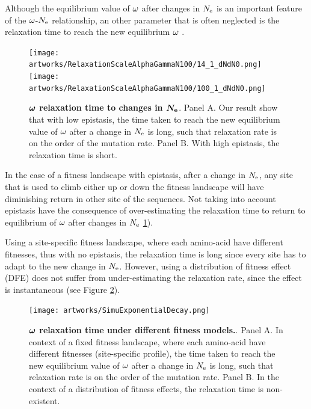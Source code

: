 \documentclass{article}
\begin{document}
Although the equilibrium value of $\omega$ after changes in $N_{\mathrm{e}}$ is an important feature of the $\omega$-$N_{\mathrm{e}}$ relationship, an other parameter that is often neglected is the relaxation time to reach the new equilibrium $\omega$ \cite{Jones2016}.
\begin{figure}[htb!]
\begin{mdframed}
	\centering
	\texttt{[image: artworks/RelaxationScaleAlphaGammaN100/14\_1\_dNdN0.png]}
	\texttt{[image: artworks/RelaxationScaleAlphaGammaN100/100\_1\_dNdN0.png]}\\
	\caption{
		\textbf{$\bm{\omega}$ relaxation time to changes in $\bm{N_{\mathrm{e}}}$}.
		Panel A. Our result show that with low epistasis, the time taken to reach the new equilibrium value of $\omega$ after a change in $N_{\mathrm{e}}$ is long, such that relaxation rate is on the order of the mutation rate.
		Panel B. With high epistasis, the relaxation time is short.
	}
	\label{fig:relaxStability}
\end{mdframed}
\end{figure}
In the case of a fitness landscape with epistasis, after a change in $N_{\mathrm{e}}$, any site that is used to climb either up or down the fitness landscape will have diminishing return in other site of the sequences.
Not taking into account epistasis have the consequence of over-estimating the relaxation time to return to equilibrium of $\omega$ after changes in $N_{\mathrm{e}}$ \ref{fig:relaxStability}).

Using a site-specific fitness landscape, where each amino-acid have different fitnesses, thus with no epistasis, the relaxation time is long since every site has to adapt to the new change in $N_{\mathrm{e}}$.
However, using a distribution of fitness effect (DFE) does not suffer from under-estimating the relaxation rate, since the effect is instantaneous (see Figure \ref{fig:relaxProfileDFE}).

\begin{figure}[htb!]
\begin{mdframed}
	\centering
	\texttt{[image: artworks/SimuExponentialDecay.png]}\\
	\caption{
		\textbf{$\bm{\omega}$ relaxation time under different fitness models.}.
		Panel A. In context of a fixed fitness landscape, where each amino-acid have different fitnesses (site-specific profile), the time taken to reach the new equilibrium value of $\omega$ after a change in $N_{\mathrm{e}}$ is long, such that relaxation rate is on the order of the mutation rate.
		Panel B. In the context of a distribution of fitness effects, the relaxation time is non-existent.
	}
	\label{fig:relaxProfileDFE}
\end{mdframed}
\end{figure}
\end{document}

